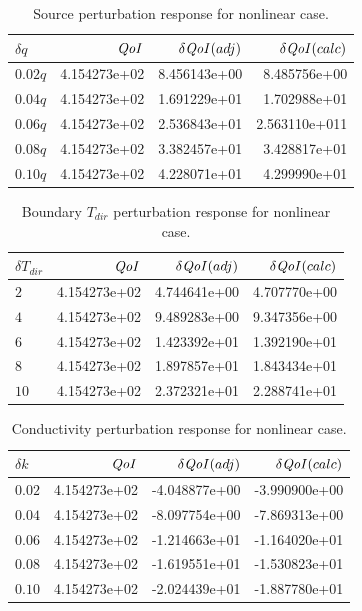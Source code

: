 \documentclass{article}
\newcommand{\qoi}{{\it QoI}\xspace}
\newcommand{\Tdir}{T_{dir}}
\begin{document}
\begin{table}[H]
\centering
  \begin{tabular}{| l | r | r | r |}
    \hline
    $\delta q$ & $\qoi$ & $\delta \qoi (adj)$ & $\delta \qoi (calc)$ \\ \hline
    $0.02q$ & 4.154273e+02 &  8.456143e+00 & 8.485756e+00  \\ \hline
    $0.04q$ & 4.154273e+02 &  1.691229e+01 & 1.702988e+01 \\ \hline
    $0.06q$ & 4.154273e+02 &  2.536843e+01 & 2.563110e+011  \\ \hline
    $0.08q$ & 4.154273e+02 &  3.382457e+01 & 3.428817e+01  \\ \hline
    $0.10q$ &  4.154273e+02 &   4.228071e+01 & 4.299990e+01  \\ \hline
    \end{tabular}
  \caption{Source perturbation response for nonlinear case.}
\end{table}

\begin{table}[H]
\centering
  \begin{tabular}{| l | r | r | r |}
    \hline
    $\delta \Tdir$ & $\qoi$ & $\delta \qoi (adj)$ & $\delta \qoi (calc)$ \\ \hline
    $2$ & 4.154273e+02  &  4.744641e+00  &  4.707770e+00    \\ \hline
    $4$ & 4.154273e+02  &  9.489283e+00 &  9.347356e+00 \\ \hline
    $6$ & 4.154273e+02  &  1.423392e+01 &  1.392190e+01   \\ \hline
    $8$ & 4.154273e+02  &  1.897857e+01 & 1.843434e+01  \\ \hline
    $10$ & 4.154273e+02  & 2.372321e+01 & 2.288741e+01   \\ \hline
    \end{tabular}
  \caption{Boundary $\Tdir$ perturbation response for nonlinear case.}
\end{table}

\begin{table}[H]
\centering
  \begin{tabular}{| l | r | r | r |}
    \hline
    $\delta k$ & $\qoi$ & $\delta \qoi (adj)$ & $\delta \qoi (calc)$ \\ \hline
    $0.02$ & 4.154273e+02 & -4.048877e+00 &  -3.990900e+00  \\ \hline
    $0.04$ & 4.154273e+02 & -8.097754e+00 &  -7.869313e+00  \\ \hline
    $0.06$ & 4.154273e+02 & -1.214663e+01 &  -1.164020e+01  \\ \hline
    $0.08$ & 4.154273e+02  &  -1.619551e+01 & -1.530823e+01 \\ \hline
    $0.10$ &  4.154273e+02 &  -2.024439e+01 & -1.887780e+01  \\ \hline
    \end{tabular}
  \caption{Conductivity perturbation response for nonlinear case.}
\end{table}
\end{document}
